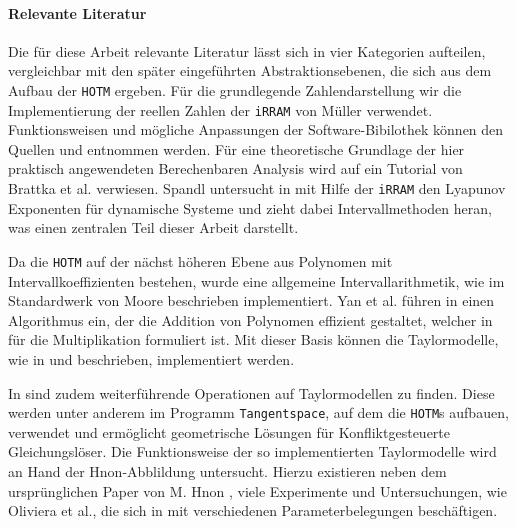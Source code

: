 \paragraph{Relevante Literatur}
Die für diese Arbeit relevante Literatur lässt sich in vier Kategorien aufteilen, vergleichbar mit den später eingeführten Abstraktionsebenen, die sich aus dem Aufbau der \verb+HOTM+ ergeben. Für die grundlegende Zahlendarstellung wir die Implementierung der reellen Zahlen der \verb+iRRAM+ von Müller verwendet. Funktionsweisen und mögliche Anpassungen der Software-Bibilothek können den Quellen \cite{Mller2009EnhancingIE} und  \cite{mueller2001} entnommen werden. Für eine theoretische Grundlage der hier praktisch angewendeten Berechenbaren Analysis wird auf ein Tutorial von Brattka et al. \cite{Brattka2008} verwiesen. Spandl untersucht in \cite{DBLP:spandl} mit Hilfe der \verb+iRRAM+ den Lyapunov Exponenten für dynamische Systeme und zieht dabei Intervallmethoden heran, was einen zentralen Teil dieser Arbeit darstellt. 

Da die \verb+HOTM+ auf der nächst höheren Ebene aus Polynomen mit Intervallkoeffizienten bestehen, wurde eine allgemeine Intervallarithmetik, wie im Standardwerk von Moore \cite{moore1979} beschrieben implementiert. Yan et al. führen in \cite{geobuckets} einen Algorithmus ein, der die Addition von Polynomen effizient gestaltet, welcher in \cite{geobucketsmulti} für die Multiplikation formuliert ist. Mit dieser Basis können die Taylormodelle, wie in \cite{makino2001} und \cite{DBLP:conf/macis/BrausseKM15} beschrieben, implementiert werden.

In \cite{DBLP:conf/macis/BrausseKM15} sind zudem weiterführende Operationen auf Taylormodellen zu finden. Diese werden unter anderem im Programm \verb+Tangentspace+, auf dem die \verb+HOTM+s aufbauen, verwendet und ermöglicht geometrische Lösungen für Konfliktgesteuerte Gleichungslöser. Die Funktionsweise der so implementierten Taylormodelle wird an Hand der H\e non-Abblildung untersucht. Hierzu existieren neben dem ursprünglichen Paper von M. H\e non \cite{henon1976}, viele Experimente und Untersuchungen, wie Oliviera et al., die sich in \cite{MartinsdeOliveira2020} mit verschiedenen Parameterbelegungen beschäftigen.






